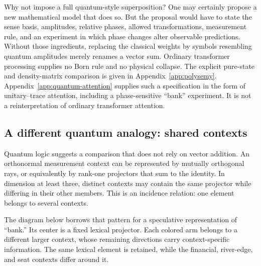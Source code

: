 \documentclass[
  aps,
  reprint,
  superscriptaddress,
  floatfix,
  nofootinbib,
  longbibliography
]{revtex4-2}
\begin{document}
Why not impose a full quantum-style superposition?  One may certainly propose
a new mathematical model that does so.  But the proposal would have to state
the sense basis, amplitudes, relative phases, allowed transformations,
measurement rule, and an experiment in which phase changes alter observable
predictions.  Without those ingredients, replacing the classical weights by
symbols resembling quantum amplitudes merely renames a vector sum.  Ordinary
transformer processing supplies no Born rule and no physical collapse.  The
explicit pure-state and density-matrix comparison is given in
Appendix~\ref{app:polysemy}.  Appendix~\ref{app:quantum-attention} supplies
such a specification in the form of unitary--trace attention, including a
phase-sensitive ``bank'' experiment.  It is not a reinterpretation of
ordinary transformer attention.

\subsection{A different quantum analogy: shared contexts}

Quantum logic suggests a comparison that does not rely on vector addition.
An orthonormal measurement context can be represented by mutually orthogonal
rays, or equivalently by rank-one projectors that sum to the identity.  In
dimension at least three, distinct contexts may contain the same projector
while differing in their other members.  This is an incidence relation: one
element belongs to several contexts.

The diagram below borrows that pattern for a speculative representation of
``bank.''  Its center is a fixed lexical projector.  Each colored arm belongs
to a different larger context, whose remaining directions carry
context-specific information.  The same lexical element is retained, while
the financial, river-edge, and seat contexts differ around it.
\end{document}

